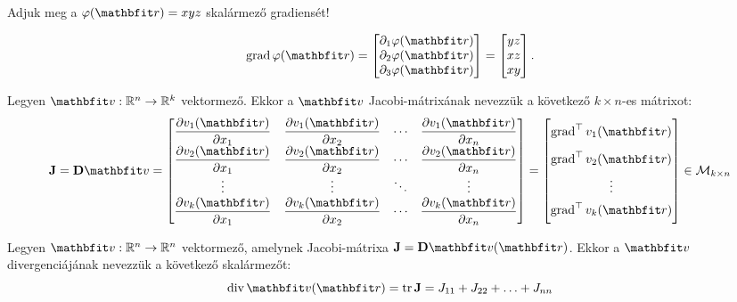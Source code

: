 \documentclass{szb-practice}
\begin{document}
\begin{example}
  Adjuk meg a $\varphi(\coordvec) = xyz$ skalármező gradiensét!

  $$
    \grad \varphi(\coordvec)
    = \begin{bmatrix}
      \partial_1 \varphi(\coordvec) \\
      \partial_2 \varphi(\coordvec) \\
      \partial_3 \varphi(\coordvec)
    \end{bmatrix}
    = \begin{bmatrix}
      yz \\
      xz \\
      xy
    \end{bmatrix}
    \text.
  $$
\end{example}

\begin{definition}
  Legyen $\rvec v: \Reals^n \to \Reals^k$ vektormező. Ekkor a $\rvec v$
  Jacobi-mátrixának nevezzük a következő $k \times n$-es mátrixot:
  \def\arraystretch{1.5}%
  $$
    \rmat J = \DD \rvec v = \begin{bmatrix}
      \displaystyle\pdv{v_1(\coordvec)}{x_1} & \displaystyle\pdv{v_1(\coordvec)}{x_2} & \cdots & \displaystyle\pdv{v_1(\coordvec)}{x_n} \\
      \displaystyle\pdv{v_2(\coordvec)}{x_1} & \displaystyle\pdv{v_2(\coordvec)}{x_2} & \cdots & \displaystyle\pdv{v_2(\coordvec)}{x_n} \\
      \vdots                                 & \vdots                                 & \ddots & \vdots                                 \\
      \displaystyle\pdv{v_k(\coordvec)}{x_1} & \displaystyle\pdv{v_k(\coordvec)}{x_2} & \cdots & \displaystyle\pdv{v_k(\coordvec)}{x_n}
    \end{bmatrix} = \begin{bmatrix}
      \grad^\T v_1(\coordvec) \vphantom{\displaystyle\pdv{v_1}{x_1}} \\
      \grad^\T v_2(\coordvec) \vphantom{\displaystyle\pdv{v_1}{x_1}} \\
      \vdots                                                         \\
      \grad^\T v_k(\coordvec) \vphantom{\displaystyle\pdv{v_1}{x_1}}
    \end{bmatrix} \in \mathcal M_{k \times n}
  $$
\end{definition}

\begin{definition}[Divergencia]
  Legyen $\rvec v: \Reals^n \to \Reals^n$ vektormező, amelynek Jacobi-mátrixa
  $\rmat J = \DD \rvec v(\coordvec)$. Ekkor a $\rvec v$ divergenciájának
  nevezzük a következő skalármezőt:
  $$
    \Div \rvec v(\coordvec)
    = \trace \rmat J
    = J_{11} + J_{22} + \ldots + J_{nn}
  $$
\end{definition}
\end{document}
